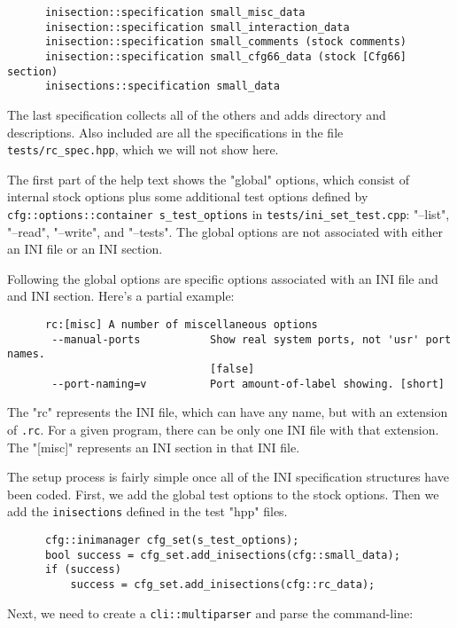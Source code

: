    \begin{verbatim}
      inisection::specification small_misc_data
      inisection::specification small_interaction_data
      inisection::specification small_comments (stock comments)
      inisection::specification small_cfg66_data (stock [Cfg66] section)
      inisections::specification small_data
   \end{verbatim}

   The last specification collects all of the others and adds directory and
   descriptions.  Also included are all the specifications in the
   file \texttt{tests/rc\_spec.hpp}, which we will not show here.


   The first part of the help text shows the "global" options, which consist
   of internal stock options plus some additional test options
   defined by \texttt{cfg::options::container s\_test\_options} in
   \texttt{tests/ini\_set\_test.cpp}:
   "--list", "--read", "--write", and "--tests".
   The global options are not associated with either an INI file
   or an INI section.

   Following the global options are specific options associated with an
   INI file and and INI section.  Here's a partial example:

   \begin{verbatim}
      rc:[misc] A number of miscellaneous options
       --manual-ports           Show real system ports, not 'usr' port names.
                                [false]
       --port-naming=v          Port amount-of-label showing. [short]
   \end{verbatim}

   The "rc" represents the INI file, which can have any name, but with an
   extension of \texttt{.rc}.
   For a given program, there can be only one INI file with that extension.
   The "[misc]" represents an INI section in that INI file.

   The setup process is fairly simple once all of the INI specification
   structures have been coded. First, we add the global test options
   to the stock options. Then we add the \texttt{inisections}
   defined in the test "hpp" files.

   \begin{verbatim}
      cfg::inimanager cfg_set(s_test_options);
      bool success = cfg_set.add_inisections(cfg::small_data);
      if (success)
          success = cfg_set.add_inisections(cfg::rc_data);
   \end{verbatim}

   Next, we need to create a \texttt{cli::multiparser} and parse the
   command-line:

